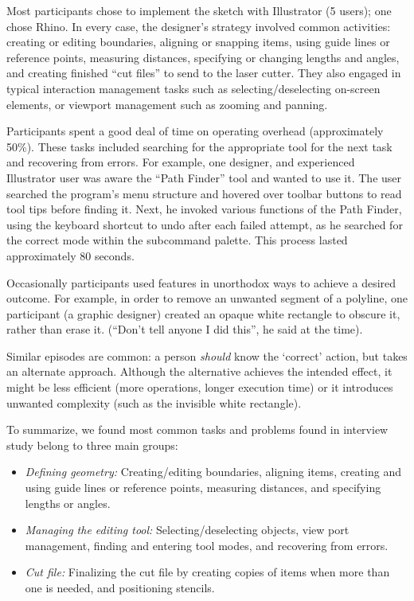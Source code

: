 \documentclass{article}
\begin{document}
Most participants chose to implement the sketch with Illustrator (5
users); one chose Rhino. In every case, the designer's strategy
involved common activities: creating or editing boundaries, aligning
or snapping items, using guide lines or reference points, measuring
distances, specifying or changing lengths and angles, and creating
finished ``cut files'' to send to the laser cutter.  They also engaged
in typical interaction management tasks such as selecting/deselecting
on-screen elements, or viewport management such as zooming and
panning.

Participants spent a good deal of time on operating overhead
(approximately 50\%). These tasks included searching for the
appropriate tool for the next task and recovering from errors. For
example, one designer, and experienced Illustrator user was aware the
``Path Finder'' tool and wanted to use it. The user searched the
program's menu structure and hovered over toolbar buttons to read tool
tips before finding it. Next, he invoked various functions of the Path
Finder, using the keyboard shortcut to undo after each failed attempt,
as he searched for the correct mode within the subcommand
palette. This process lasted approximately 80 seconds.

Occasionally participants used features in unorthodox ways to achieve
a desired outcome. For example, in order to remove an unwanted segment
of a polyline, one participant (a graphic designer) created an opaque
white rectangle to obscure it, rather than erase it. (``Don't tell
anyone I did this'', he said at the time).

Similar episodes are common: a person \textit{should} know the
`correct' action, but takes an alternate approach. Although the
alternative achieves the intended effect, it might be less efficient
(more operations, longer execution time) or it introduces unwanted
complexity (such as the invisible white rectangle).

To summarize, we found most common tasks and problems found in
interview study belong to three main groups:

\begin{itemize}
\item \textit{Defining geometry:} Creating/editing boundaries,
  aligning items, creating and using guide lines or reference points,
  measuring distances, and specifying lengths or angles.
\item \textit{Managing the editing tool:} Selecting/deselecting
  objects, view port management, finding and entering tool modes, and
  recovering from errors.
\item \textit{Cut file:} Finalizing the cut file by creating copies of
  items when more than one is needed, and positioning stencils.
\end{itemize}
\end{document}
